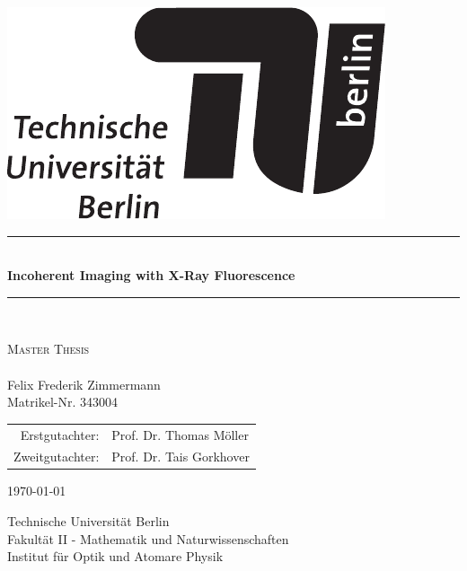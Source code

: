 \begin{titlepage}
		
	\begin{center}
				
				
		\begin{flushright}
			\includegraphics[width=.3\textwidth]{images/TU_Logo.pdf}\\[2.5cm]    
			\end{flushright}
					
					
			{\newcommand{\HRule}{\rule{\linewidth}{0.5mm}}
				\HRule \\[0.4cm]
				\LARGE{\bfseries Incoherent Imaging with X-Ray Fluorescence}\\
							
				\HRule \\[1.5cm]}
			\textsc{\Large Master Thesis}\\[0.5cm]
					
			\\
			Felix Frederik Zimmermann\\
			Matrikel-Nr. 343004\\[0.5cm]
			
			\begin{table}[h]
				\centering
				\begin{tabular}{rl}
					Erstgutachter:& Prof. Dr. Thomas Möller\\
					Zweitgutachter:& Prof. Dr. Tais Gorkhover\\
				\end{tabular}
			\end{table}		
			{\large \today}
			
			\vfill
					
			Technische Universität Berlin\\
			Fakultät II - Mathematik und Naturwissenschaften\\
			Institut für Optik und Atomare Physik\\					
		\end{center}
			
	\end{titlepage}